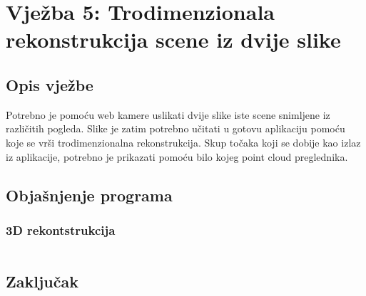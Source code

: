\setcounter{figure}{0}
\setcounter{lstlisting}{0}
\section{Vježba 5: Trodimenzionala rekonstrukcija scene iz dvije slike}

\subsection{Opis vježbe}
Potrebno je pomoću web kamere uslikati dvije slike iste scene snimljene iz
različitih pogleda. Slike je zatim potrebno učitati u gotovu aplikaciju pomoću
koje se vrši trodimenzionalna rekonstrukcija.  Skup točaka koji se dobije kao
izlaz iz aplikacije, potrebno je prikazati pomoću bilo kojeg point cloud
preglednika.
\\

\subsection{Objašnjenje programa}

\newpage
\subsubsection{3D rekontstrukcija}

\begin{lstlisting}[language=C,caption={Detekcija objekta na drugoj
    slici}]
\end{lstlisting}

\newpage
\subsection{Zaključak}
